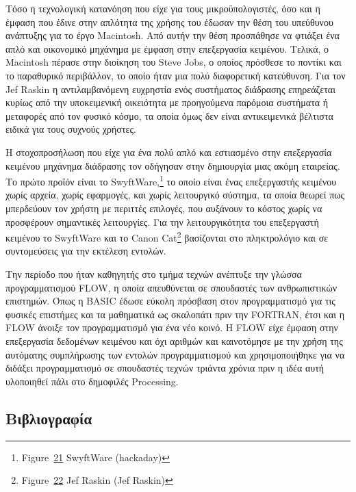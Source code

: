 \documentclass[
]{article}
\begin{document}
Τόσο η τεχνολογική κατανόηση που είχε για τους μικροϋπολογιστές, όσο και
η έμφαση που έδινε στην απλότητα της χρήσης του έδωσαν την θέση του
υπεύθυνου ανάπτυξης για το έργο Macintosh. Από αυτήν την θέση προσπάθησε
να φτιάξει ένα απλό και οικονομικό μηχάνημα με έμφαση στην επεξεργασία
κειμένου. Τελικά, ο Macintosh πέρασε στην διοίκηση του Steve Jobs, ο
οποίος πρόσθεσε το ποντίκι και το παραθυρικό περιβάλλον, το οποίο ήταν
μια πολύ διαφορετική κατεύθυνση. Για τον Jef Raskin η αντιλαμβανόμενη
ευχρηστία ενός συστήματος διάδρασης επηρεάζεται κυρίως από την
υποκειμενική οικειότητα με προηγούμενα παρόμοια συστήματα ή μεταφορές
από τον φυσικό κόσμο, τα οποία όμως δεν είναι αντικειμενικά βέλτιστα
ειδικά για τους συχνούς χρήστες.

Η στοχοπροσήλωση που είχε για ένα πολύ απλό και εστιασμένο στην
επεξεργασία κειμένου μηχάνημα διάδρασης τον οδήγησαν στην δημιουργία
μιας ακόμη εταιρείας. Το πρώτο προϊόν είναι το SwyftWare,\footnote{Figure~\protect\hyperlink{fig:swyftware}{21}
  SwyftWare (hackaday)} το οποίο είναι ένας επεξεργαστής κειμένου χωρίς
αρχεία, χωρίς εφαρμογές, και χωρίς λειτουργικό σύστημα, τα οποία θεωρεί
πως μπερδεύουν τον χρήστη με περιττές επιλογές, που αυξάνουν το κόστος
χωρίς να προσφέρουν σημαντικές λειτουργίες. Για την λειτουργικότητα του
επεξεργαστή κειμένου το SwyftWare και το Canon Cat\footnote{Figure~\protect\hyperlink{fig:raskin-profile}{22}
  Jef Raskin (Jef Raskin)} βασίζονται στο πληκτρολόγιο και σε
συντομεύσεις για την εκτέλεση εντολών.

Την περίοδο που ήταν καθηγητής στο τμήμα τεχνών ανέπτυξε την γλώσσα
προγραμματισμού FLOW, η οποία απευθύνεται σε σπουδαστές των
ανθρωπιστικών επιστημών. Όπως η BASIC έδωσε εύκολη πρόσβαση στον
προγραμματισμό για τις φυσικές επιστήμες και τα μαθηματικά ως σκαλοπάτι
πριν την FORTRAN, έτσι και η FLOW άνοιξε τον προγραμματισμό για ένα νέο
κοινό. Η FLOW είχε έμφαση στην επεξεργασία δεδομένων κειμένου και όχι
αριθμών και καινοτόμησε με την χρήση της αυτόματης συμπλήρωσης των
εντολών προγραμματισμού και χρησιμοποιήθηκε για να διδάξει
προγραμματισμό σε σπουδαστές τεχνών τριάντα χρόνια πριν η ιδέα αυτή
υλοποιηθεί πάλι στο δημοφιλές Processing.

\hypertarget{ux3b2ux3b9ux3b2ux3bbux3b9ux3bfux3b3ux3c1ux3b1ux3c6ux3afux3b1}{%
\subsection*{Βιβλιογραφία}\label{ux3b2ux3b9ux3b2ux3bbux3b9ux3bfux3b3ux3c1ux3b1ux3c6ux3afux3b1}}
\end{document}
